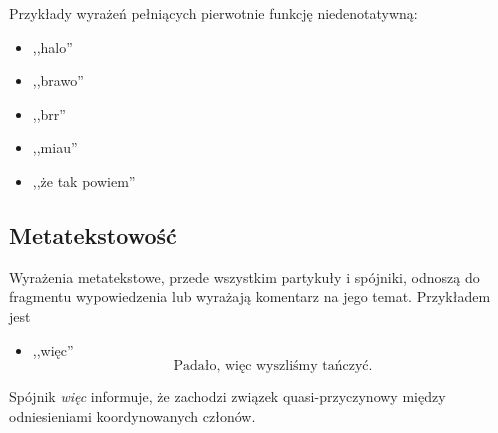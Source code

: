 \documentclass[a4paper, 12pt]{article}
\theoremstyle{remark}
\begin{document}
Przykłady wyrażeń pełniących pierwotnie funkcję niedenotatywną:
\begin{itemize}
	\item ,,halo''
	\item ,,brawo''
	\item ,,brr''
	\item ,,miau''
	\item ,,że tak powiem''
\end{itemize}

\subsection{Metatekstowość}
Wyrażenia metatekstowe, przede wszystkim partykuły i spójniki, odnoszą do fragmentu wypowiedzenia lub wyrażają komentarz na jego temat. Przykładem jest
\begin{itemize}
\item ,,więc''
\begin{equation}
	\text{Padało, więc wyszliśmy tańczyć.} 
\end{equation}
\end{itemize}
Spójnik \emph{więc} informuje, że zachodzi związek quasi-przyczynowy między odniesieniami koordynowanych członów.
\end{document}
